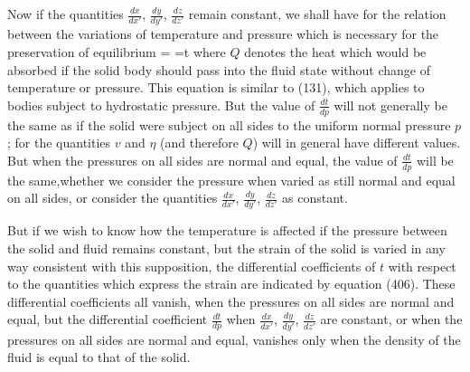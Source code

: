 \documentclass[12pt]{article}
\begin{document}
{Now if the quantities $\frac{dx}{dx'}$, $\frac{dy}{dy'}$, $\frac{dz}{dz'}$ remain constant, we shall have for the relation between the variations of temperature and pressure which is necessary for the preservation of equilibrium
\eqs {} = =t  \label{407}\eqe
where $Q$ denotes the heat which would be absorbed if the solid body should pass into the fluid state without change of temperature or pressure. This equation is similar to (131), which applies to bodies subject to hydrostatic pressure. But the value of $\frac{dt}{dp}$ will not generally be the same as if the solid were subject on all sides to the uniform normal pressure $p$; for the quantities $v$ and $\eta$ (and therefore $Q$) will in general have different values. But when the pressures on all sides are normal and equal, the value of $\frac{dt}{dp}$  will be the same,whether we consider the pressure when varied as still normal and equal on all sides, or consider the quantities $\frac{dx}{dx'}$, $\frac{dy}{dy'}$, $\frac{dz}{dz'}$ as constant.

But if we wish to know how the temperature is affected if the pressure between the solid and fluid remains constant, but the strain of the solid is varied in any way consistent with this supposition, the differential coefficients of $t$ with respect to the quantities which express the strain are indicated by equation (406). These differential coefficients all vanish, when the pressures on all sides are normal and equal, but the differential coefficient $\frac{dt}{dp}$ when $\frac{dx}{dx'}$, $\frac{dy}{dy'}$, $\frac{dz}{dz'}$ are constant, or when the pressures on all sides are normal and equal, vanishes only when the density of the fluid is equal to that of the solid.


}
\end{document}
